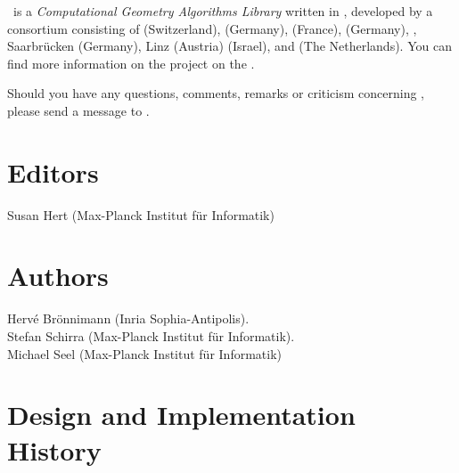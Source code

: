 
\cgal\ is a {\em Computational Geometry Algorithms Library} written in \CC, 
developed by a consortium consisting of
 (Switzerland), 
 (Germany), 
 (France),
 (Germany),
,
Saarbr\"ucken (Germany),
 Linz (Austria)
 (Israel), and
 (The Netherlands). 
You can find more information on the project on the 
.

Should you have any questions, comments, remarks or criticism concerning 
\cgal, please send a message to 
.


\section*{Editors}

Susan Hert (Max-Planck Institut f\"ur Informatik) 

\section*{Authors}

Herv\'e Br\"onnimann ({\sc Inria} Sophia-Antipolis). \\
Stefan Schirra (Max-Planck Institut f\"ur Informatik).\\
Michael Seel (Max-Planck Institut f\"ur Informatik)

\section*{Design and Implementation History}

